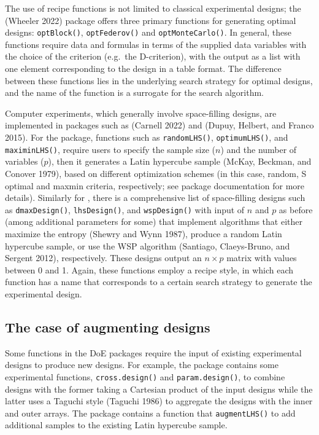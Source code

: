 The use of recipe functions is not limited to classical experimental designs; the  (Wheeler 2022) package offers three primary functions for generating optimal designs: \texttt{optBlock()}, \texttt{optFederov()} and \texttt{optMonteCarlo()}. In general, these functions require data and formulas in terms of the supplied data variables with the choice of the criterion (e.g.~the D-criterion), with the output as a list with one element corresponding to the design in a table format. The difference between these functions lies in the underlying search strategy for optimal designs, and the name of the function is a surrogate for the search algorithm.

Computer experiments, which generally involve space-filling designs, are implemented in packages such as  (Carnell 2022) and  (Dupuy, Helbert, and Franco 2015). For the  package, functions such as \texttt{randomLHS()}, \texttt{optimumLHS()}, and \texttt{maximinLHS()}, require users to specify the sample size (\(n\)) and the number of variables (\(p\)), then it generates a Latin hypercube sample (McKay, Beckman, and Conover 1979), based on different optimization schemes (in this case, random, S optimal and maxmin criteria, respectively; see package documentation for more details). Similarly for , there is a comprehensive list of space-filling designs such as \texttt{dmaxDesign()}, \texttt{lhsDesign()}, and \texttt{wspDesign()} with input of \(n\) and \(p\) as before (among additional parameters for some) that implement algorithms that either maximize the entropy (Shewry and Wynn 1987), produce a random Latin hypercube sample, or use the WSP algorithm (Santiago, Claeys-Bruno, and Sergent 2012), respectively. These designs output an \(n \times p\) matrix with values between 0 and 1. Again, these functions employ a recipe style, in which each function has a name that corresponds to a certain search strategy to generate the experimental design.

\hypertarget{the-case-of-augmenting-designs}{%
\subsection{The case of augmenting designs}\label{the-case-of-augmenting-designs}}

Some functions in the DoE packages require the input of existing experimental designs to produce new designs. For example, the  package contains some experimental functions, \texttt{cross.design()} and \texttt{param.design()}, to combine designs with the former taking a Cartesian product of the input designs while the latter uses a Taguchi style (Taguchi 1986) to aggregate the designs with the inner and outer arrays. The  package contains a function that \texttt{augmentLHS()} to add additional samples to the existing Latin hypercube sample.

